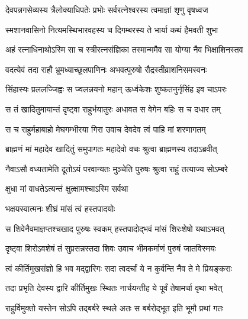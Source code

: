 \twolineshloka
{देवपन्नगसेव्यस्य त्रैलोक्याधिपतेः प्रभोः}
{सर्वरत्नेश्वरस्य त्वमाज्ञां शृणु वृषध्वज} %

\twolineshloka
{स्मशानवासिनो नित्यमस्थिभारवहस्य च}
{दिगम्बरस्य ते भार्या कथं हैमवती शुभा} %

\twolineshloka
{अहं रत्नाधिनाथोऽस्मि सा च स्त्रीरत्नसंज्ञिका}
{तस्मान्ममैव सा योग्या नैव भिक्षाशिनस्तव} %


\twolineshloka
{वदत्येवं तदा राहौ भ्रूमध्याच्छूलपाणिनः}
{अभवत्पुरुषो रौद्रस्तीव्राशनिसमस्वनः} %

\twolineshloka
{सिंहास्यः प्रललज्जिह्वः स ज्वलन्नयनो महान्}
{ऊर्ध्वकेशः शुष्कतनुर्नृसिंह इव चाऽपरः} %

\twolineshloka
{स तं खादितुमायान्तं दृष्ट्वा राहुर्भयातुरः}
{अधावत स वेगेन बहिः स च दधार तम्} %

\twolineshloka
{स च राहुर्महाबाहो मेघगम्भीरया गिरा}
{उवाच देवदेव त्वं पाहि मां शरणागतम्} %

\twolineshloka
{ब्राह्मणं मां महादेव खादितुं समुपागतः}
{महादेवो वचः श्रुत्वा ब्राह्मणस्य तदाऽब्रवीत्} %

\twolineshloka
{नैवाऽसौ वध्यतामेति दूतोऽयं परवान्यतः}
{मुञ्चेति पुरुषः श्रुत्वा राहुं तत्याज्य सोऽम्बरे} %




\onelineshloka
{क्षुधा मां वाधतेऽत्यन्तं क्षुत्क्षामश्चाऽस्मि सर्वथा} %




\onelineshloka
{भक्षयस्वात्मनः शीघ्रं मांसं त्वं हस्तपादयोः} %


\twolineshloka
{स शिवेनैवमाज्ञप्तश्चखाद पुरुषः स्वकम्}
{हस्तपादोद्भवं मांसं शिरःशेषो यथाऽभवत्} %

\twolineshloka
{दृष्ट्वा शिरोऽवशेषं तं सुप्रसन्नस्तदा शिवः}
{उवाच भीमकर्माणं पुरुषं जातविस्मयः} %


\twolineshloka
{त्वं कीर्तिमुखसंज्ञो हि भव मद्द्वारिगः सदा}
{त्वदर्चां ये न कुर्वन्ति नैव ते मे प्रियङ्कराः} %


\twolineshloka
{तदा प्रभृति देवस्य द्वारि कीर्तिमुखः स्थितः}
{नार्चयन्तीह ये पूर्वं तेषामर्चा वृथा भवेत्} %

\twolineshloka
{राहुर्विमुक्तो यस्तेन सोऽपि तद्बर्बरे स्थले}
{अतः स बर्बरोद्भूत इति भूमौ प्रथां गतः} %

